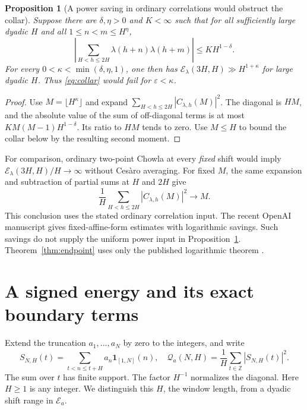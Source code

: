 \documentclass[11pt]{amsart}
\newtheorem{proposition}[theorem]{Proposition}
\theoremstyle{definition}
\theoremstyle{remark}
\newcommand{\E}{\mathcal E}
\newcommand{\Q}{\mathcal Q}
\newcommand{\one}{\mathbf 1}
\numberwithin{equation}{section}
\begin{document}
\begin{proposition}[A power saving in ordinary correlations would obstruct the collar]\label{prop:power}
Suppose there are \(\delta,\eta>0\) and \(K<\infty\) such that for all sufficiently large dyadic \(H\) and all \(1\le n<m\le H^\eta\),
\[
 \left|\sum_{H<h\le2H}\lambda(h+n)\lambda(h+m)\right|
 \le K H^{1-\delta}.
\]
For every \(0<\kappa<\min(\delta,\eta,1)\), one then has \(\E_\lambda(3H,H)\gg H^{1+\kappa}\) for large dyadic \(H\). Thus \eqref{eq:collar} would fail for \(\varepsilon<\kappa\).
\end{proposition}
\begin{proof}
Use \(M=\lfloor H^\kappa\rfloor\) and expand \(\sum_{H<h\le2H}|C_{\lambda,h}(M)|^2\). The diagonal is \(HM\), and the absolute value of the sum of off-diagonal terms is at most \(KM(M-1)H^{1-\delta}\). Its ratio to \(HM\) tends to zero. Use \(M\le H\) to bound the collar below by the resulting second moment.
\end{proof}

For comparison, ordinary two-point Chowla at every \emph{fixed} shift would imply
\(\E_\lambda(3H,H)/H\to\infty\) without Ces\`aro averaging. For fixed \(M\), the same expansion and subtraction of partial sums at \(H\) and \(2H\) give
\[
 \frac1H\sum_{H<h\le2H}|C_{\lambda,h}(M)|^2\to M .
\]
This conclusion uses the stated ordinary correlation input. The recent OpenAI manuscript \cite{oaichowla} gives fixed-affine-form estimates with logarithmic savings. Such savings do not supply the uniform power input in Proposition~\ref{prop:power}. Theorem~\ref{thm:endpoint} uses only the published logarithmic theorem \cite{tao}.

\section{A signed energy and its exact boundary terms}\label{sec:fejer}

Extend the truncation \(a_1,\ldots,a_N\) by zero to the integers, and write
\[
 S_{N,H}(t)=\sum_{t<n\le t+H}a_n\one_{[1,N]}(n),\quad
 \Q_a(N,H)=\frac1H\sum_{t\in\mathbb Z}|S_{N,H}(t)|^2.
\]
The sum over \(t\) has finite support. The factor \(H^{-1}\) normalizes the diagonal. Here \(H\ge1\) is any integer. We distinguish this \(H\), the window length, from a dyadic shift range in \(\E_a\).
\end{document}
